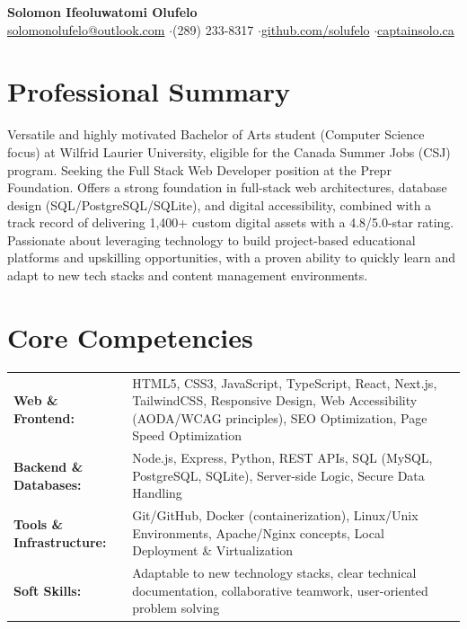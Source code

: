 \documentclass[a4paper,10pt]{article}
\begin{document}
\begin{center}
    {\LARGE \textbf{Solomon Ifeoluwatomi Olufelo}} \\[2pt]
    \href{mailto:solomonolufelo@outlook.com}{solomonolufelo@outlook.com} \enspace$\cdot$\enspace (289) 233-8317 \enspace$\cdot$\enspace \href{https://github.com/solufelo}{github.com/solufelo} \enspace$\cdot$\enspace \href{https://captainsolo.ca}{captainsolo.ca}
\end{center}

\section*{Professional Summary}
Versatile and highly motivated Bachelor of Arts student (Computer Science focus) at Wilfrid Laurier University, eligible for the Canada Summer Jobs (CSJ) program. Seeking the Full Stack Web Developer position at the Prepr Foundation. Offers a strong foundation in full-stack web architectures, database design (SQL/PostgreSQL/SQLite), and digital accessibility, combined with a track record of delivering 1,400+ custom digital assets with a 4.8/5.0-star rating. Passionate about leveraging technology to build project-based educational platforms and upskilling opportunities, with a proven ability to quickly learn and adapt to new tech stacks and content management environments.

\section*{Core Competencies}
\begin{tabularx}{\textwidth}{@{}lX@{}}
\textbf{Web \& Frontend:} & HTML5, CSS3, JavaScript, TypeScript, React, Next.js, TailwindCSS, Responsive Design, Web Accessibility (AODA/WCAG principles), SEO Optimization, Page Speed Optimization \\
\textbf{Backend \& Databases:} & Node.js, Express, Python, REST APIs, SQL (MySQL, PostgreSQL, SQLite), Server-side Logic, Secure Data Handling \\
\textbf{Tools \& Infrastructure:} & Git/GitHub, Docker (containerization), Linux/Unix Environments, Apache/Nginx concepts, Local Deployment \& Virtualization \\
\textbf{Soft Skills:} & Adaptable to new technology stacks, clear technical documentation, collaborative teamwork, user-oriented problem solving \\
\end{tabularx}
\end{document}
